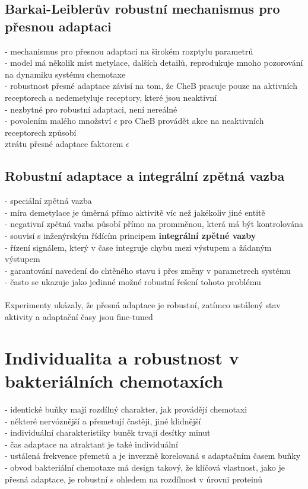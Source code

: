 \documentclass[11pt,a4paper]{report}
\begin{document}
\subsection{Barkai-Leiblerův robustní mechanismus pro přesnou adaptaci}
- mechanismus pro přesnou adaptaci na širokém rozptylu parametrů\\
- model má několik míst metylace, dalších detailů, reprodukuje mnoho pozorování na dynamiku systému chemotaxe\\
- robustnost přesné adaptace závisí na tom, že CheB pracuje pouze na aktivních receptorech a nedemetyluje receptory, které jsou neaktivní\\
\indent - nezbytné pro robustní adaptaci, není nereálné\\
\indent - povolením malého množství $\epsilon$ pro CheB provádět akce na neaktivních receptorech způsobí\\
\indent \indent ztrátu přesné adaptace faktorem $\epsilon$

\subsection{Robustní adaptace a integrální zpětná vazba}
- speciální zpětná vazba\\
\indent - míra demetylace je úměrná přímo aktivitě víc než jakékoliv jiné entitě\\
\indent - negativní zpětná vazba působí přímo na promměnou, která má být kontrolována\\
\indent - souvisí s inženýrským řídícím principem \textbf{integrální zpětné vazby}\\
\indent \indent - řízení signálem, který v čase integruje chybu mezi výstupem a žádaným výstupem\\
\indent \indent - garantování navedení do chtěného stavu i přes změny v parametrech systému\\
\indent \indent - často se ukazuje jako jedinné možné robustní řešení tohoto problému\\
\\
Experimenty ukázaly, že přesná adaptace je robustní, zatímco ustálený stav aktivity a adaptační časy jsou fine-tuned

\section{Individualita a robustnost v bakteriálních chemotaxích}
- identické buňky mají rozdílný charakter, jak provádějí chemotaxi\\
\indent - některé nervóznější a přemetují častěji, jiné klidnější\\
- individuální charakteristiky buněk trvají desítky minut\\
- čas adaptace na atraktant je také individuální\\
- ustálená frekvence přemetů a je inverzně korelovaná s adaptačním časem buňky\\
- obvod bakteriální chemotaxe má design takový, že klíčová vlastnost, jako je přesná adaptace, je robustní s ohledem na rozdílnost v úrovni proteinů \\ 
\end{document}
